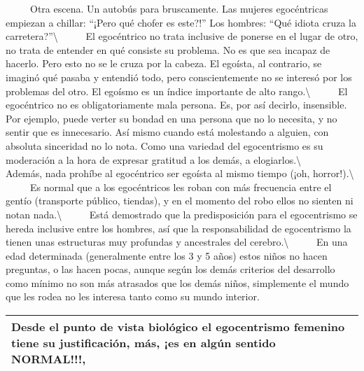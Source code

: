 ~ ~ ~ Otra escena. Un autobús para bruscamente. Las mujeres egocéntricas
empiezan a chillar: ``¡Pero qué chofer es este?!'' Los hombres: ``Qué
idiota cruza la carretera?''\textbackslash{} ~ ~ ~ El egocéntrico no
trata inclusive de ponerse en el lugar de otro, no trata de entender en
qué consiste su problema. No es que sea incapaz de hacerlo. Pero esto no
se le cruza por la cabeza. El egoísta, al contrario, se imaginó qué
pasaba y entendió todo, pero conscientemente no se interesó por los
problemas del otro. El egoísmo es un índice importante de alto
rango.\textbackslash{} ~ ~ ~ El egocéntrico no es obligatoriamente mala
persona. Es, por así decirlo, insensible. Por ejemplo, puede verter su
bondad en una persona que no lo necesita, y no sentir que es
innecesario. Así mismo cuando está molestando a alguien, con absoluta
sinceridad no lo nota. Como una variedad del egocentrismo es su
moderación a la hora de expresar gratitud a los demás, a
elogiarlos.\textbackslash{} ~ ~ ~ Además, nada prohíbe al egocéntrico
ser egoísta al mismo tiempo (¡oh, horror!).\textbackslash{} ~ ~ ~ Es
normal que a los egocéntricos les roban con más frecuencia entre el
gentío (transporte público, tiendas), y en el momento del robo ellos no
sienten ni notan nada.\textbackslash{} ~ ~ ~ Está demostrado que la
predisposición para el egocentrismo se hereda inclusive entre los
hombres, así que la responsabilidad de egocentrismo la tienen unas
estructuras muy profundas y ancestrales del cerebro.\textbackslash{} ~ ~
~ En una edad determinada (generalmente entre los 3 y 5 años) estos
niños no hacen preguntas, o las hacen pocas, aunque según los demás
criterios del desarrollo como mínimo no son más atrasados que los demás
niños, simplemente el mundo que les rodea no les interesa tanto como su
mundo interior.

\begin{longtable}[]{@{}l@{}}
\toprule
Desde el punto de vista biológico el egocentrismo femenino tiene su
justificación, más, ¡es en algún sentido
\textbf{NORMAL!!!},\tabularnewline
\bottomrule
\end{longtable}

